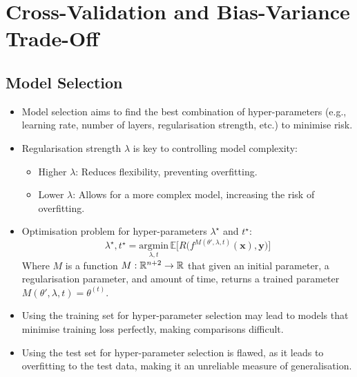 \chapter{Cross-Validation and Bias-Variance Trade-Off}

\section{Model Selection}

\begin{itemize}
    \item Model selection aims to find the best combination of hyper-parameters (e.g., learning rate, number of layers, regularisation strength, etc.) to minimise risk.
    \item Regularisation strength $\lambda$ is key to controlling model complexity:
          \begin{itemize}
              \item Higher $\lambda$: Reduces flexibility, preventing overfitting.
              \item Lower $\lambda$: Allows for a more complex model, increasing the risk of overfitting.
          \end{itemize}
    \item Optimisation problem for hyper-parameters $\lambda^\star$ and $t^\star$:
          \[
              \lambda^{\star}, t^{\star} = \underset{\lambda, t}{\text{argmin}} \, \mathbb{E} \Big[R\Big(f^{M(\theta', \lambda, t)}(\mathbf{x}), \mathbf{y}\Big)\Big]
          \]
          Where $M$ is a function $M : \mathbb{R}^{n+2} \rightarrow \mathbb{R}$ that given an initial parameter, a regularisation parameter, and amount of time, returns a trained parameter $M(\theta', \lambda, t)=\theta^{(t)}$.
    \item Using the training set for hyper-parameter selection may lead to models that minimise training loss perfectly, making comparisons difficult.
    \item Using the test set for hyper-parameter selection is flawed, as it leads to overfitting to the test data, making it an unreliable measure of generalisation.
\end{itemize}



